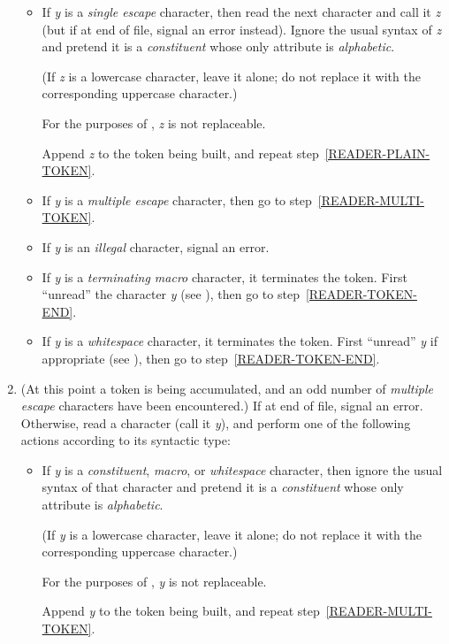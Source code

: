 \begin{enumerate}
\begin{itemize}
\item
If {\it y} is a {\it single escape} character, then read the next character
and call it {\it z}
(but if at end of file, signal an error instead).
Ignore the usual syntax of {\it z}
and pretend it is a {\it constituent} whose only attribute is
{\it alphabetic}.
\begin{obsolete}
(If {\it z} is a lowercase character, leave it alone;
do not replace it with the corresponding uppercase character.)
\end{obsolete}
\begin{newer}
For the purposes of , {\it z} is not replaceable.
\end{newer}
Append {\it z} to the token being built,
and repeat step~\ref{READER-PLAIN-TOKEN}.

\item
If {\it y} is a {\it multiple escape} character,
then go to step~\ref{READER-MULTI-TOKEN}.

\item
If {\it y} is an {\it illegal} character, signal an error.

\item
If {\it y} is a {\it terminating macro} character, it terminates
the token.  First ``unread'' the character {\it y}
(see ), then go to step~\ref{READER-TOKEN-END}.

\item
If {\it y} is a {\it whitespace} character, it terminates
the token.  First ``unread'' {\it y}
if appropriate (see ),
then go to step~\ref{READER-TOKEN-END}.
\end{itemize}

\item
(At this point a token is being accumulated, and an odd number
of {\it multiple escape} characters have been encountered.)
If at end of file, signal an error.
Otherwise, read a character (call it {\it y}), and
perform one of the following actions according to its syntactic type:
\label{READER-MULTI-TOKEN}
\begin{itemize}
\item
If {\it y} is a {\it constituent}, {\it macro}, or {\it whitespace}
character, then ignore the usual syntax of that character
and pretend it is a {\it constituent} whose only attribute is
{\it alphabetic}.
\begin{obsolete}
(If {\it y} is a lowercase character, leave it alone;
do not replace it with the corresponding uppercase character.)
\end{obsolete}
\begin{newer}
For the purposes of , {\it y} is not replaceable.
\end{newer}
Append {\it y} to the token being built,
and repeat step~\ref{READER-MULTI-TOKEN}.


\end{itemize}
\end{enumerate}
